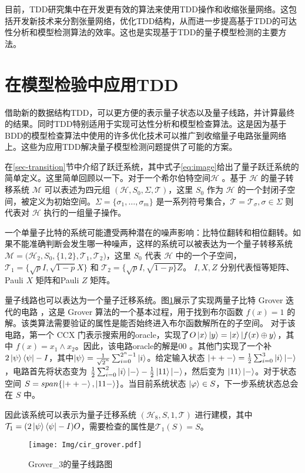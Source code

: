 目前，TDD研究集中在开发更有效的算法来使用TDD操作和收缩张量网络。这包括开发新技术来分割张量网络，优化TDD结构，从而进一步提高基于TDD的可达性分析和模型检测算法的效率。这也是实现基于TDD的量子模型检测的主要方法。

\section{在模型检验中应用TDD}
借助新的数据结构TDD，可以更方便的表示量子状态以及量子线路，并计算最终的结果。同时TDD特别适用于实现可达性分析和模型检查算法。这是因为基于BDD的模型检查算法中使用的许多优化技术可以推广到收缩量子电路张量网络上\citep{Chaki_2018}。这些为应用TDD解决量子模型检测问题提供了可能的方案。

在\ref{sec-transition}节中介绍了跃迁系统，其中式子\ref{eq:image}给出了量子跃迁系统的简单定义。这里简单回顾以一下。对于一个希尔伯特空间$\mathcal{H}$ 。基于 $\mathcal{H}$ 的量子转移系统 $\mathcal{M}$ 可以表述为四元组 $(\mathcal{H}, S_0, \Sigma, \mathcal{T})$，这里 $S_0$ 作为 $\mathcal{H}$ 的一个封闭子空间，被定义为初始空间。$\Sigma=\{\sigma_1,\ldots,\sigma_m\}$ 是一系列符号集合，$\mathcal{T}=\mathcal{T}_\sigma, {\sigma \in \Sigma}$ 则代表对 $\mathcal{H}$ 执行的一组量子操作。


\begin{example}
    一个单量子比特的系统可能遭受两种潜在的噪声影响：比特位翻转和相位翻转。如果不能准确判断会发生哪一种噪声，这样的系统可以被表达为一个量子转移系统 $\mathcal{M}=\big(\mathcal{H}_2,S_0,\{1,2\},{\mathcal{T}_1,\mathcal{T}_2} \big)$，这里 $S_0$ 代表 $\mathcal{H}$ 中的一个子空间，$\mathcal{T}_1=\{\sqrt{p}I, \sqrt{1-p}X\}$ 和 $\mathcal{T}_2=\{\sqrt{p}I, \sqrt{1-p\}Z}$。 $I,X,Z$ 分别代表恒等矩阵、Pauli $X$ 矩阵和Pauli $Z$ 矩阵。
\end{example}
\begin{example}
    \label{ex-image-grover}
    量子线路也可以表达为一个量子迁移系统。图\ref{fig:grover}展示了实现两量子比特 Grover 迭代的电路 \citep{Grover_1996}，这是 Grover 算法的一个基本过程，用于找到布尔函数 $f(x)=1$ 的解。该类算法需要验证的属性是能否始终进入布尔函数解所在的子空间。
    对于该电路，第一个 CCX 门表示搜索用的oracle，实现了$ O\ket{x}\ket{y}=\ket{x}\ket{f(x)\oplus y}$，其中 $f(x)=x_1 \wedge x_2$。因此，该电路oracle的解是\(00\) 。其他门实现了一个补$2\ket{\psi}\bra{\psi}-I$，其中$\ket{\psi}=\frac{1}{\sqrt{2}^{n}}\sum_{i=0}^{2^n-1}\ket{i}$。给定输入状态 $\ket{++-}=\frac{1}{2}\sum_{i=0}^3\ket{i}\ket{-}$，电路首先将状态变为 $\frac{1}{2}\sum_{i=0}^2 \ket{i}\ket{-}-\frac{1}{2}\ket{11}\ket{-}$，然后变为 $\ket{11}\ket{-}$。对于状态空间 $S=span\{\ket{++-},\ket{11-}\}$。当目前系统状态 $\ket{\varphi} \in S$，下一步系统状态总会在 $S$ 中。

    因此该系统可以表示为量子迁移系统 $(\mathcal{H}_8, S, {1}, \mathcal{T})$ 进行建模，其中 $\mathcal{T}_1 = {(2\ket{\psi}\bra{\psi}-I) O}$，需要检查的属性是$\mathcal{T}_1(S)=S$。
    \begin{figure}[!htbp]
        \centering
        \texttt{[image: Img/cir\_grover.pdf]}
        \caption{Grover\_3的量子线路图}
        \label{fig:grover}
    \end{figure} 
\end{example}

